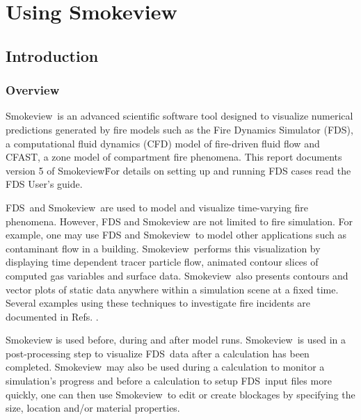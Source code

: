 \documentclass[11pt,twoside]{book}
\newcommand{\FDS}{{FDS}}
\newcommand{\fds}{{FDS}}
\newcommand{\Smokeview}{{Smokeview}}
\newcommand{\smokeview}{{Smokeview}}
\begin{document}
\part{Using Smokeview}
\chapter{Introduction}
\section{Overview}
\Smokeview\ is an advanced scientific software tool designed to visualize numerical
predictions generated by fire models such as the Fire Dynamics Simulator (\fds),
a computational fluid dynamics (CFD) model of fire-driven fluid
flow\cite{FDS_Tech_Guide_5} and CFAST, a zone model of compartment fire phenomena\cite{Jones:2004A}. This report documents version 5 of
\smokeview\. For details on setting up and
running FDS cases read the FDS User's
guide\cite{FDS_Users_Guide_5}.

\FDS\ and \smokeview\ are used to model and visualize time-varying fire
phenomena. However, FDS and Smokeview are not limited to fire
simulation. For example, one may use FDS and \smokeview\ to model
other applications such as contaminant flow in a building.
\Smokeview\ performs this visualization by displaying time
dependent tracer particle flow, animated contour slices of
computed gas variables and surface data. \Smokeview\ also presents
contours and vector plots of static data anywhere within a
simulation scene at a fixed time. Several examples using these
techniques to investigate fire incidents are documented in Refs.
\cite{CHERRYROAD,IOWA,HOUSTON,WTC}.

Smokeview is used before, during and after model runs.
\smokeview\ is used in a post-processing step to
visualize \fds\ data after a calculation has been completed.
\Smokeview\  may also be used during a calculation to monitor a
simulation's progress and before a calculation to setup \fds\
input files more quickly, one can then use \smokeview\ to edit or
create blockages by specifying the size, location and/or material
properties.
\end{document}
